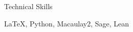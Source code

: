 \begin{rubric}{Technical Skills}

\entry*[Languages]
\LaTeX, Python, Macaulay2, Sage, Lean%
%
\end{rubric}